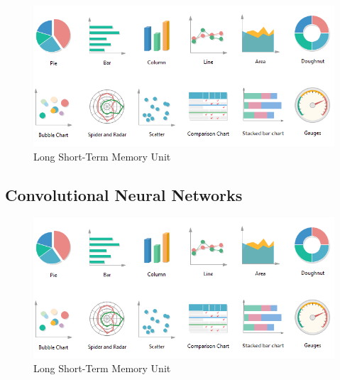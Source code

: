 \documentclass[12pt]{article}
\begin{document}
            \begin{figure}[ht]
            
                \begin{center}

                    \includegraphics[scale=0.5]{types-of-graphs.png}
                    \caption{Long Short-Term Memory Unit \cite{yan2016}}
        
                \end{center}
                
            \end{figure}

          

        \subsection{Convolutional Neural Networks}

           

            \begin{figure}[ht]
            
                \begin{center}

                    \includegraphics[scale=0.5]{types-of-graphs.png}
                    \caption{Long Short-Term Memory Unit \cite{data-basecamp}}
        
                \end{center}
                
            \end{figure}
\end{document}
